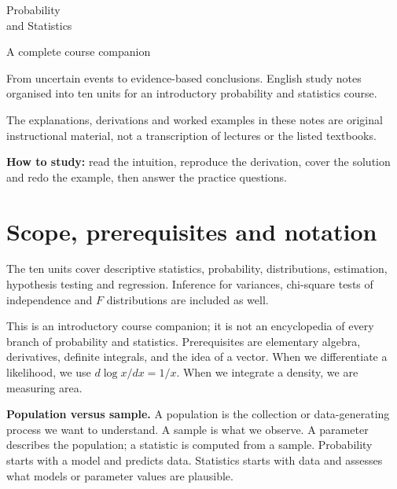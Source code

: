 \begin{titlepage}
\vspace*{22mm}
{\Huge Probability\\[4mm] and Statistics\par}
\vspace{8mm}
{\Large A complete course companion\par}
\vspace{10mm}
From uncertain events to evidence-based conclusions.
\vfill
English study notes organised into ten units for an introductory
probability and statistics course.

The explanations,
derivations and worked examples in these notes are original instructional
material, not a transcription of lectures or the listed textbooks.
\vspace{8mm}

\textbf{How to study:} read the intuition, reproduce the derivation,
cover the solution and redo the example, then answer the practice questions.
\end{titlepage}
\setcounter{tocdepth}{1}
\tableofcontents
\clearpage
\section*{Scope, prerequisites and notation}
The ten units cover descriptive statistics, probability, distributions,
estimation, hypothesis testing and regression. Inference for variances,
chi-square tests of independence and $F$ distributions are included as well.

This is an introductory course companion; it is
not an encyclopedia of every branch of probability and statistics.
Prerequisites are elementary algebra, derivatives, definite integrals,
and the idea of a vector. When we differentiate a likelihood, we use
$d\log x/dx=1/x$. When we integrate a density, we are measuring area.

\textbf{Population versus sample.} A population is the collection or
data-generating process we want to understand. A sample is what we observe.
A parameter describes the population; a statistic is computed from a sample.
Probability starts with a model and predicts data. Statistics starts with
data and assesses what models or parameter values are plausible.

